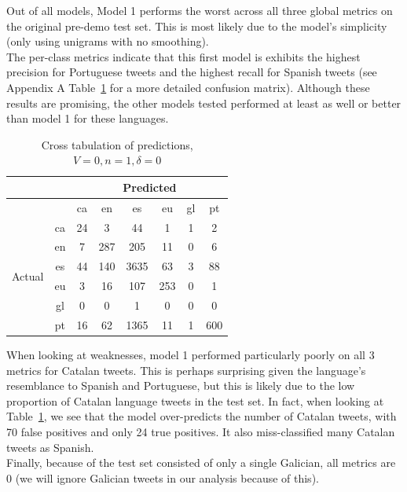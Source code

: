 \documentclass[runningheads]{llncs}
\begin{document}
Out of all models, Model 1 performs the worst across all three global metrics on the original pre-demo test set. This is most likely due to the model's simplicity (only using unigrams with no smoothing). \\

The per-class metrics indicate that this first model is exhibits the highest precision for Portuguese tweets and the highest recall for Spanish tweets (see Appendix A Table~\ref{tab:pre_demo_confusion_0_1_0} for a more detailed confusion matrix). Although these results are promising, the other models tested performed at least as well or better than model 1 for these languages. \\

\begin{table}
	\centering
	\caption{Cross tabulation of predictions, $V=0, n=1, \delta=0$}
	\label{tab:pre_demo_confusion_0_1_0}
	\begin{tabular}{|c|c|c|c|c|c|c|c|} \hline
		& & \multicolumn{6}{c|}{Predicted} \\ \hline
		& &  ca &   en &    es &   eu &  gl &   pt \\ \hline
		\multirow{6}{*}{Actual} & ca   &  24 &    3 &    44 &    1 &   1 &    2 \\
		& en   &   7 &  287 &   205 &   11 &   0 &    6 \\
		& es   &  44 &  140 &  3635 &   63 &   3 &   88 \\
		& eu   &   3 &   16 &   107 &  253 &   0 &    1 \\
		& gl   &   0 &    0 &     1 &    0 &   0 &    0 \\
		& pt   &  16 &   62 &  1365 &   11 &   1 &  600 \\ \hline
	\end{tabular}
\end{table}

When looking at weaknesses, model 1 performed particularly poorly on all 3 metrics for Catalan tweets. This is perhaps surprising given the language's resemblance to Spanish and Portuguese, but this is likely due to the low proportion of Catalan language tweets in the test set. In fact, when looking at Table~\ref{tab:pre_demo_confusion_0_1_0}, we see that the model over-predicts the number of Catalan tweets, with 70 false positives and only 24 true positives. It also miss-classified many Catalan tweets as Spanish. \\

Finally, because of the test set consisted of only a single Galician, all metrics are 0 (we will ignore Galician tweets in our analysis because of this).
\end{document}
